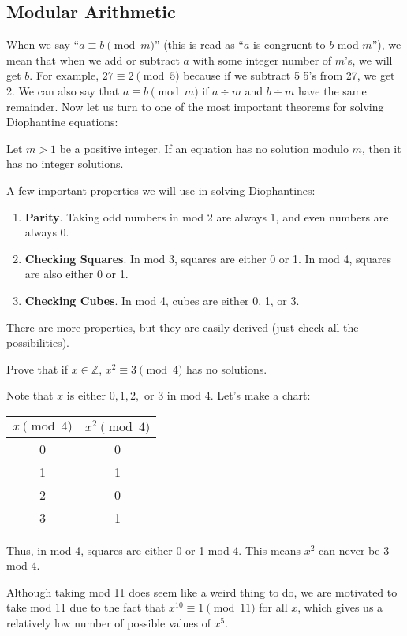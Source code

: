 \documentclass[mast]{lucky}
\begin{document}
\subsection{Modular Arithmetic}
When we say ``$a\equiv b\pmod{m}$'' (this is read as ``$a$ is congruent to $b$ mod $m$''), we mean that when we add or subtract $a$ with some integer number of $m$'s, we will get $b$. For example, $27\equiv 2\pmod{5}$ because if we subtract 5 5's from 27, we get 2. We can also say that $a\equiv b\pmod{m}$ if $a\div m$ and $b\div m$ have the same remainder. Now let us turn to one of the most important theorems for solving Diophantine equations:
\begin{theo} 
Let $m>1$ be a positive integer. If an equation has no solution modulo $m$, then it has no integer solutions.
\end{theo}
A few important properties we will use in solving Diophantines:
\begin{enumerate}
\item \textbf{Parity}. Taking odd numbers in mod 2 are always 1, and even numbers are always 0.
\item \textbf{Checking Squares}. In mod 3, squares are either 0 or 1. In mod 4, squares are also either 0 or 1. 
\item \textbf{Checking Cubes}. In mod 4, cubes are either 0, 1, or 3. 
\end{enumerate}
There are more properties, but they are easily derived (just check all the possibilities). 
\begin{exam}[Folklore]
Prove that if $x\in\mathbb{Z}$, $x^2\equiv 3\pmod{4}$ has no solutions.
\end{exam}
\begin{sol}
Note that $x$ is either $0,1,2,$ or 3 in mod 4. Let's make a chart:
\begin{center}
\begin{tabular}{c|c}
    $x\pmod{4}$ & $x^2\pmod{4}$\\
    \hline
    0 & 0\\
    1 & 1\\
    2 & 0\\
    3 & 1\\
\end{tabular}
\end{center}
\noindent
Thus, in mod 4, squares are either 0 or 1 mod 4. This means $x^2$ can never be 3 mod 4.
\end{sol}
\begin{remark}
Although taking mod 11 does seem like a weird thing to do, we are motivated to take mod 11 due to the fact that $x^{10}\equiv1\pmod{11}$ for all $x$, which gives us a relatively low number of possible values of $x^5$.
\end{remark}
\end{document}
